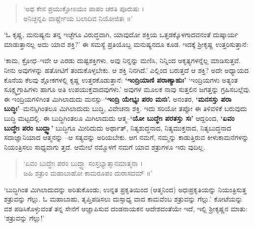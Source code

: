 \begin{verse}
‘ಅಥ ಕೇನ ಪ್ರಯುಕ್ತೋಽಯಂ ಪಾಪಂ ಚರತಿ ಪೂರುಷಃ ।\\ಅನಿಚ್ಛನ್ನಪಿ ವಾರ್ಷ್ಣೇಯ ಬಲಾದಿವ ನಿಯೋಜಿತಃ ॥’
\end{verse}

‘ಓ ಕೃಷ್ಣ, ಮನುಷ್ಯನು ತನ್ನ ಇಚ್ಛೆಗೂ ವಿರುದ್ಧವಾಗಿ, ಯಾವುದೋ ಶಕ್ತಿಯ ಒತ್ತಡಕ್ಕೊಳಗಾದವನಂತೆ ದುಷ್ಕಾರ್ಯ ಮಾಡುತ್ತಾನಲ್ಲ ಅದು ಯಾವ ಶಕ್ತಿ?’ ಈ ಸಮಸ್ಯೆ ಪ್ರತಿಯೊಬ್ಬ ಮನುಷ್ಯನದೂ ಕೂಡ. ಇದಕ್ಕೆ ಶ್ರೀಕೃಷ್ಣ ಉತ್ತರಿಸುತ್ತಾನೆ:

‘ಕಾಮ, ಕ್ರೋಧ–ಇವೇ ಆ ಎರಡು ದುಷ್ಟಶಕ್ತಿಗಳು. ಅವು ನಿನ್ನನ್ನು ಮಣಿಸಿ, ನಿನ್ನಿಂದ ಅಕೃತ್ಯಗಳನ್ನೆಲ್ಲ ಮಾಡಿಸುತ್ತವೆ. ನೀನು ಅವುಗಳನ್ನು ಹತೋಟಿಗೆ ತಂದುಕೊಳ್ಳಬೇಕು. ಆ ಶಕ್ತಿ ನಿನಗಿದೆ.’ ಎಲ್ಲಿಂದ ಬರುತ್ತದೆ ಆ ಶಕ್ತಿ? ಅದೇ ಅಧ್ಯಾಯದ ಕೊನೆಯ ಕೆಲವು ಶ್ಲೋಕಗಳಲ್ಲಿ ಕೃಷ್ಣ ಉತ್ತರಕೊಡುತ್ತಾನೆ: \textbf{‘ಇಂದ್ರಿಯಾಣಿ ಪರಾಣ್ಯಾಹುಃ’} ‘ಇಂದ್ರಿಯಗಳು ಅತ್ಯಂತ ಸೂಕ್ಷ್ಮಗ್ರಾಹಿಗಳು ಹಾಗೂ ಅತಿ ಉಪಯುಕ್ತವಾದವುಗಳು.’ ಅವುಗಳ ಮೂಲಕ ನಾವು ಸುತ್ತಲಿನ ಜಗತ್ತನ್ನು ಗ್ರಹಿಸಬಲ್ಲೆವು. ಈ ಇಂದ್ರಿಯಗಳಿಗಿಂತ ಮಿಗಿಲಾದುದು ಮನಸ್ಸು–\textbf{‘ಇಂದ್ರಿ ಯೇಭ್ಯಃ ಪರಂ ಮನಃ’.} ಅನಂತರ, \textbf{‘ಮನಸಸ್ತು ಪರಾ ಬುದ್ಧಿಃ’}–ಮನಸ್ಸಿಗಿಂತಲೂ ಮಿಗಿಲಾದುದು ಬುದ್ಧಿ, ವಿವೇಚನಾ ಶಕ್ತಿ. ಇದು ಸರಿಯೋ ತಪ್ಪೋ ಈ ತಿಳಿವಳಿಕೆ ಬರುವುದು ಬುದ್ಧಿ ಮಟ್ಟದಲ್ಲಿ. ಈ ಬುದ್ಧಿಗಿಂತಲೂ ಮಿಗಿಲಾದುದು ಆತ್ಮ–\textbf{‘ಯೋ ಬುದ್ಧೇಃ ಪರತಸ್ತು ಸಃ’} ಆದ್ದರಿಂದ, \textbf{‘ಏವಂ ಬುದ್ಧೇಃ ಪರಂ ಬುದ್ಧ್ವಾ’} ಬುದ್ಧಿಗೂ ಮೀರಿದುದು ಅರ್ಥಾತ್, ನಿತ್ಯಶುದ್ಧನಾದ, ನಿತ್ಯಮುಕ್ತನಾದ, ನಿತ್ಯಬುದ್ಧನಾದ ಸದಾಜ್ಞಾನಿಯಾದ ಆತ್ಮನನ್ನು –ಆ ಸತ್ಯವನ್ನು ಅರಿಯಬೇಕು. ಆಗ ನಮಗೆ, ನಮ್ಮನ್ನು ಕಾಡುತ್ತಿರುವ ಕೀಳುಕಾಮನೆಗಳನ್ನು ನಿಯಂತ್ರಿಸಲು ಸಾಧ್ಯವಾಗು ತ್ತದೆ. ಆಮೇಲೆ ನಮ್ಮೊಳಗೆ ನಮಗೆ ಯಾವ ಶತ್ರುಗಳೂ ಇರು ವುದಿಲ್ಲ.

\begin{verse}
‘ಏವಂ ಬುದ್ಧೇಃ ಪರಂ ಬುದ್ಧ್ವಾ ಸಂಸ್ತಭ್ಯಾತ್ಮಾನಮಾತ್ಮನಾ ।\\ಜಹಿ ಶತ್ರುಂ ಮಹಾಬಾಹೋ ಕಾಮರೂಪಂ ದುರಾಸದಮ್ ॥’
\end{verse}

‘ಬುದ್ಧಿಗಿಂತ ಮಿಗಿಲಾದುದನ್ನು ಅರಿತುಕೊಂಡು, ಉನ್ನತ ಪ್ರಕೃತಿಯಿಂದ (ಆತ್ಮನಿಂದ) ಅಧಃಪ್ರಕೃತಿಯನ್ನು ನಿಯಂತ್ರಿಸುತ್ತ ಶತ್ರುವನ್ನು ಗೆಲ್ಲು. ಓ ಮಹಾಬಾಹು, ತೃಪ್ತಿಪಡಿಸಲು ದುಸ್ಸಾಧ್ಯ ವಾದ ಕಾಮವೆಂಬ ಶತ್ರುವನ್ನು ಗೆಲ್ಲು.’ ಕೋಟೆಯನ್ನು ವಶ ಪಡಿಸಿಕೊಳ್ಳುವಂತೆ ತನ್ನ ಸೇನೆಗೆ ಆಜ್ಞಾಪಿಸುವ ದಂಡನಾಯಕನ ಆದೇಶದಂತೆಯೇ ಇದೆ, ಇಲ್ಲಿ ಶ್ರೀಕೃಷ್ಣನ ಮಾತು: ‘ಶತ್ರುವನ್ನು ಗೆಲ್ಲು!’


